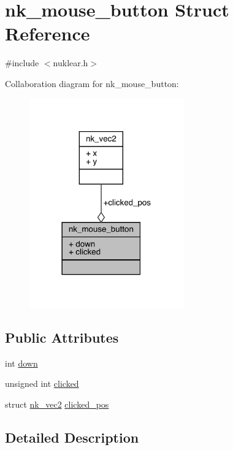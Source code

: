 \hypertarget{structnk__mouse__button}{}\section{nk\+\_\+mouse\+\_\+button Struct Reference}
\label{structnk__mouse__button}


{\ttfamily \#include $<$nuklear.\+h$>$}



Collaboration diagram for nk\+\_\+mouse\+\_\+button\+:
\nopagebreak
\begin{figure}[H]
\begin{center}
\leavevmode
\includegraphics[width=189pt]{structnk__mouse__button__coll__graph}
\end{center}
\end{figure}
\subsection*{Public Attributes}
\begin{DoxyCompactItemize}
\item 
int \mbox{\hyperlink{structnk__mouse__button_a917be25314608b6c56e648ed14fe29b7}{down}}
\item 
unsigned int \mbox{\hyperlink{structnk__mouse__button_a1b685639b8ff0c166ece7097f89be423}{clicked}}
\item 
struct \mbox{\hyperlink{structnk__vec2}{nk\+\_\+vec2}} \mbox{\hyperlink{structnk__mouse__button_a4a025ef1d8ff957864230a2f72c92983}{clicked\+\_\+pos}}
\end{DoxyCompactItemize}


\subsection{Detailed Description}


